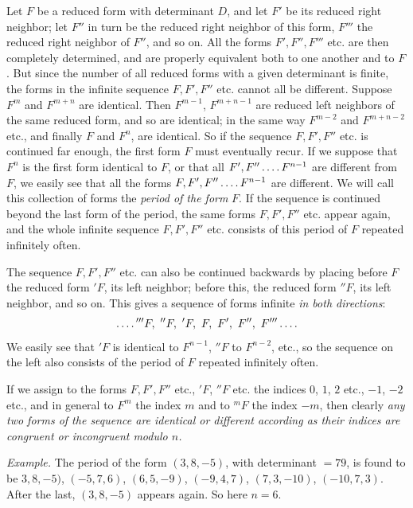 Let $F$ be a reduced form with determinant $D$, and let $F'$ be its reduced right neighbor; let $F''$ in turn be the reduced right neighbor of this form, $F'''$ the reduced right neighbor of $F''$, and so on. All the forms $F',F'',F'''$ etc. are then completely determined, and are properly equivalent both to one another and to $F$. But since the number of all reduced forms with a given determinant is finite, the forms in the infinite sequence $F,F',F''$ etc. cannot all be different. Suppose $F^m$ and $F^{m+n}$ are identical. Then $F^{m-1}$, $F^{m+n-1}$ are reduced left neighbors of the same reduced form, and so are identical; in the same way $F^{m-2}$ and $F^{m+n-2}$ etc., and finally $F$ and $F^n$, are identical. So if the sequence $F,F',F''$ etc. is continued far enough, the first form $F$ must eventually recur. If we suppose that $F^n$ is the first form identical to $F$, or that all $F',F''\mathinner{\ldotp\ldotp\ldotp\ldotp} F^{n-1}$ are different from $F$, we easily see that all the forms $F,F',F''\mathinner{\ldotp\ldotp\ldotp\ldotp} F^{n-1}$ are different. We will call this collection of forms the \textit{period of the form} $F$. If the sequence is continued beyond the last form of the period, the same forms $F,F',F''$ etc. appear again, and the whole infinite sequence $F,F',F''$ etc. consists of this period of $F$ repeated infinitely often.

The sequence $F,F',F''$ etc. can also be continued backwards by placing before $F$ the reduced form ${}'F$, its left neighbor; before this, the reduced form ${}''F$, its left neighbor, and so on. This gives a sequence of forms infinite \textit{in both directions}:
\[
\mathinner{\ldotp\ldotp\ldotp\ldotp} {}'''F,\ {}''F,\ {}'F,\ F,\ F',\ F'',\ F'''\mathinner{\ldotp\ldotp\ldotp\ldotp}
\]
We easily see that ${}'F$ is identical to $F^{n-1}$, ${}''F$ to $F^{n-2}$, etc., so the sequence on the left also consists of the period of $F$ repeated infinitely often.

If we assign to the forms $F,F',F''$ etc., ${}'F$, ${}''F$ etc. the indices $0$, $1$, $2$ etc., $-1$, $-2$ etc., and in general to $F^m$ the index $m$ and to ${}^mF$ the index $-m$, then clearly \textit{any two forms of the sequence are identical or different according as their indices are congruent or incongruent modulo $n$.}

\textit{Example.} The period of the form $(3,8,-5)$, with determinant $=79$, is found to be ${3,8,-5)}$, $(-5,7,6)$, $(6,5,-9)$, $(-9,4,7)$, $(7,3,-10)$, $(-10,7,3)$. After the last, $(3,8,-5)$ appears again. So here $n=6$.

